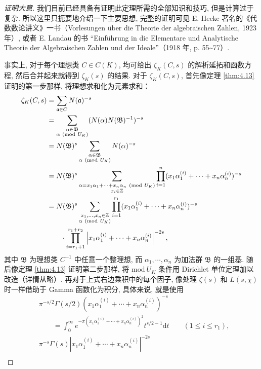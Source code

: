 \begin{proof}[证明大意]
我们目前已经具备有证明此定理所需的全部知识和技巧, 但是计算过于复杂. 所以这里只扼要地介绍一下主要思想, 完整的证明可见 E. Hecke 著名的《代数数论讲义》一书（Vorlesungen über die Theorie der algebraischen Zahlen, 1923 年）, 或者 E. Landau 的书 ``Einführung in die Elementare und Analytische Theorie der Algebraischen Zahlen und der Ideale''（1918 年, p. 55\~{}77）. 

事实上, 对于每个理想类 $C\in C(K)$, 均可给出 $\zeta_K(C,s)$ 的解析延拓和函数方程, 然后合并起来就得到 $\zeta_K(s)$ 的结果. 对于 $\zeta_K(C,s)$, 首先像定理 \ref{thm:4.13} 证明的第一步那样, 将理想求和化为元素求和：
\begin{align*}
  \zeta_K(C,s)&=\sum_{\mathfrak{a}\in C}N(\mathfrak{a})^{-s}\\
  &=\sum_{\substack{\alpha\in\mathfrak{B}\\ \alpha\ (\mathrm{mod}\ U_K)}}(N(\alpha)N(\mathfrak{B})^{-1})^{-s}\\
  &=N(\mathfrak{B})^s\sum_{\substack{\alpha\in\mathfrak{B}\\ \alpha\ (\mathrm{mod}\ U_K)}}N(\alpha)^{-s}\\
  &=N(\mathfrak{B})^s\sum_{\substack{\alpha=x_1\alpha_1+\cdots+x_n\alpha_n\ (\mathrm{mod}\ U_K)\\ x_i\in\Z}}\prod_{i=1}^{n}(x_1\alpha_1^{(i)}+\cdots+x_n\alpha_n^{(i)})^{-s}\\
  &=N(\mathfrak{B})^s\sum_{\substack{x_1,\dots,x_n\in\Z\\ \alpha\ (\mathrm{mod}\ U_K)}}\prod_{i=1}^{r_1}(x_1\alpha_1^{(i)}+\cdots+x_n\alpha_n^{(i)})^{-s}\\
  &\qquad\cdot\prod_{i=r_1+1}^{r_1+r_2}\left|x_1\alpha_1^{(i)}+\cdots+x_n\alpha_n^{(i)}\right|^{-2s},
\end{align*}
其中 $\mathfrak{B}$ 为理想类 $C^{-1}$ 中任意一个整理想, 而 $\alpha_1,\cdots,\alpha_n$ 为加法群 $\mathfrak{B}$ 的一组基. 随后像定理 \ref{thm:4.13} 证明第二步那样, 将 $\mathrm{mod}\ U_K$ 条件用 Dirichlet 单位定理加以改造（详情从略）. 再对于上式右边乘积中的每个因子, 像处理 $\zeta(s)$ 和 $L(s,\chi)$ 时一样借助于 Gamma 函数化为积分, 具体来说, 就是使用
\begin{align*}
  &\pi^{-s/2}\Gamma(s/2)(x_1\alpha_1^{(i)}+\cdots+x_n\alpha_n^{(i)})^{-s}\\
  &\qquad=\int_0^{\infty}e^{-\pi(x_1\alpha_1^{(i)}+\cdots+x_n\alpha_n^{(i)})^2}t^{s/2-1}\mathrm{d}t\qquad(1\leqslant i\leqslant r_1),\\
  &\pi^{-s}\Gamma(s)|x_1\alpha_1^{(i)}+\cdots+x_n\alpha_n^{(i)}|^{-2s}\\

\end{align*}
\end{proof}
